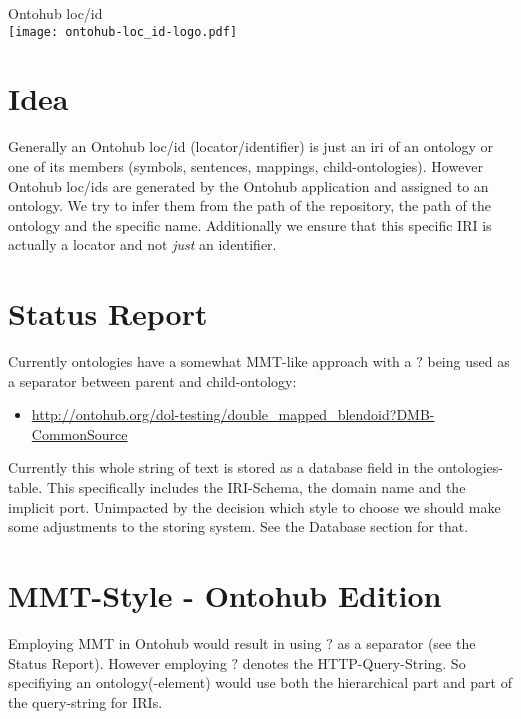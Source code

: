 \documentclass[a4paper,11pt,DIV=25]{scrartcl}
\author{Tim Reddehase}
\date{2014-09-09}
\begin{document}
\Huge
\begin{center}
  Ontohub loc/id\\
  \bigskip
  \texttt{[image: ontohub-loc\_id-logo.pdf]}
\end{center}
\normalsize

\bigskip

\section{Idea}

Generally an Ontohub loc/id (locator/identifier) is just an iri of an ontology
or one of its members (symbols, sentences, mappings, child-ontologies). However
Ontohub loc/ids are generated by the Ontohub application and assigned to an
ontology.  We try to infer them from the path of the repository, the path of
the ontology and the specific name. Additionally we ensure that this specific
IRI is actually a locator and not \textit{just} an identifier.

\section{Status Report}

Currently ontologies have a somewhat MMT-like approach with a $?$ being used as
a separator between parent and child-ontology:

\begin{itemize}
  \item \url{http://ontohub.org/dol-testing/double_mapped_blendoid?DMB-CommonSource}
\end{itemize}

Currently this whole string of text is stored as a database field in the
ontologies-table.  This specifically includes the IRI-Schema, the domain name
and the implicit port. Unimpacted by the decision which style to choose we
should make some adjustments to the storing system. See the Database section
for that.

\pagebreak

\section{MMT-Style - Ontohub Edition}

Employing MMT in Ontohub would result in using $?$ as a separator (see the
Status Report).  However employing $?$ denotes the HTTP-Query-String. So
specifiying an ontology(-element) would use both the hierarchical part and part
of the query-string for IRIs.
\end{document}
